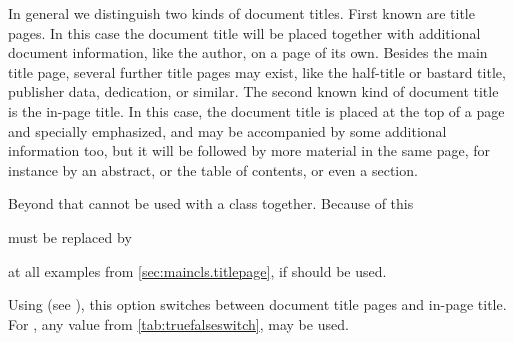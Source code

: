 In general we distinguish two kinds of document titles. First known are title
pages. In this case the document title will be placed together with additional
document information, like the author, on a page of its own. Besides the main
title page, several further title pages may exist, like the half-title or
bastard title, publisher data, dedication, or similar. The second known kind
of document title is the in-page title. In this case, the document title is
placed at the top of a page and specially emphasized, and may be accompanied
by some additional information too, but it will be followed by more material
in the same page, for instance by an abstract, or the table of contents, or
even a section.
\fi %

\ifIgnoreThis %
Beyond that  cannot be used with a \KOMAScript{}
class together. Because of this
must be replaced by
at all examples from \autoref{sec:maincls.titlepage}, if 
should be used.
\else %

\begin{Declaration}
\end{Declaration}%
%
Using  (see ), this option switches between document title pages
and in-page title. For , any value from 
\autoref{tab:truefalseswitch},  may be used.

